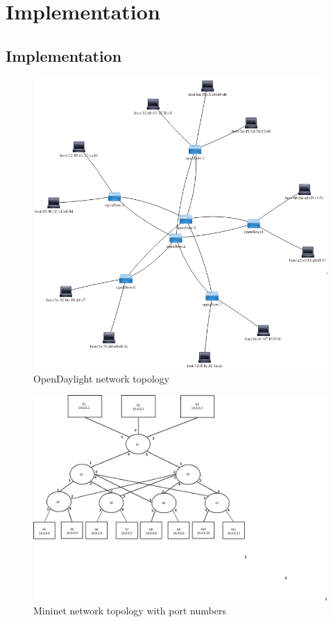 \chapter{Implementation}
\label{chapter4}

\section{Implementation}

\begin{figure}[h!]
 \centering
 \includegraphics[width=0.8\linewidth]{images/odltopo.png}
 \caption{OpenDaylight network topology}
 \label{fig:odltopo}
\end{figure}

\begin{figure}[h!]
 \centering
 \includegraphics[width=0.8\linewidth]{images/mnnetwork.png}
 \caption{Mininet network topology with port numbers}
 \label{fig:mnnetwork}
\end{figure}